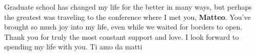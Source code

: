 \documentclass{ucetd}
\begin{document}
Graduate school has changed my life for the better in many ways, but perhaps the greatest was traveling to the conference where I met you, \textbf{Matteo}.  You've brought so much joy into my life, even while we waited for borders to open.  Thank you for truly the most constant support and love.  I look forward to spending my life with you.  Ti amo da matti 
\end{document}
